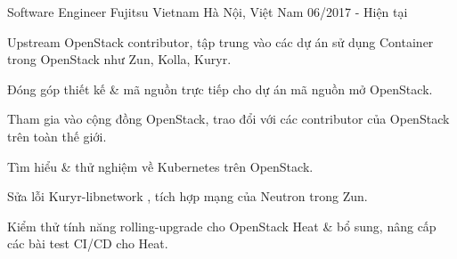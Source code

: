 \begin{cventries}
  \cventry
    {Software Engineer} %
    {Fujitsu Vietnam} %
    {Hà Nội, Việt Nam} %
    {06/2017 - Hiện tại} %
    {
      \begin{cvitems} %
        \item {Upstream OpenStack contributor, tập trung vào các dự án sử dụng Container trong OpenStack như Zun, Kolla, Kuryr.}
        \item {Đóng góp thiết kế  \& mã nguồn trực tiếp cho dự án mã nguồn mở OpenStack.}
        \item {Tham gia vào cộng đồng OpenStack, trao đổi với các contributor của OpenStack trên toàn thế giới.}
        \item {Tìm hiểu \& thử nghiệm về Kubernetes trên OpenStack.}
        \item {Sửa lỗi Kuryr-libnetwork , tích hợp mạng của Neutron trong Zun.}
        \item {Kiểm thử tính năng rolling-upgrade cho OpenStack Heat \& bổ sung, nâng cấp các bài test CI/CD cho Heat.}
      \end{cvitems}
    }

\end{cventries}
